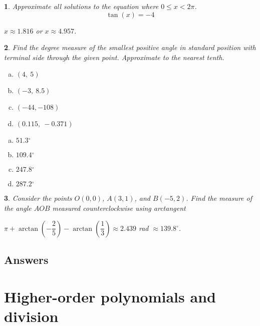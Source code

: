 \documentclass{amsbook}
\newcommand{\ssp}{\begin{enumerate}[(a), leftmargin=*]}
\newcommand{\esp}{\end{enumerate}}
\newtheorem{exc}{}
\newenvironment{ex}{\begin{exc}\normalfont}{\end{exc}}
\numberwithin{section}{chapter}
\numberwithin{equation}{chapter}
\newcommand{\drawgridxxyyb}[4]{
	\draw[thick,->] (#1,0) -- (#2,0) node[right] {$x$}; 
	\draw[thick, ->] (0,#3) -- (0,#4) node[above] {$y$};
}
\newcommand{\dg}{{^\circ}}
\begin{document}
\begin{ex}
	Approximate all solutions to the equation where $0 \leq x < 2\pi$. $$ \tan(x) = -4 $$
	\begin{sol}
		$x \approx 1.816$ or $x \approx 4.957$.
		\end{sol}
\end{ex}

\begin{ex}
	Find the degree measure of the smallest positive angle in standard position with terminal side through the given point. Approximate to the nearest tenth.
	\ssp
	\item $(4,\ 5)$
	\item $(-3,\ 8.5)$
	\item $(-44, -108)$
	\item $(0.115,\ -0.371)$
	\esp
	\begin{sol}
			\ssp
		\item $51.3\dg$
		\item $ 109.4\dg$
		\item $ 247.8\dg$
		\item $ 287.2 \dg$
		\esp
		\end{sol}
\end{ex}

\begin{ex}
	Consider the points $O(0,0)$, $A(3,1)$, and $B(-5,2)$. Find the measure of the angle $AOB$ measured counterclockwise using arctangent
	\begin{sol}
		$\pi + \arctan\left( -\dfrac{2}{5} \right) - \arctan\left( \dfrac{1}{3} \right) \approx 2.439$ rad $\approx 139.8\dg$.
	\end{sol}
\end{ex}


\subsection*{Answers \nopunct} \hfill
\begin{multicols}{2}
	
\end{multicols}


\newpage

\section{Higher-order polynomials and division}

\end{document}
